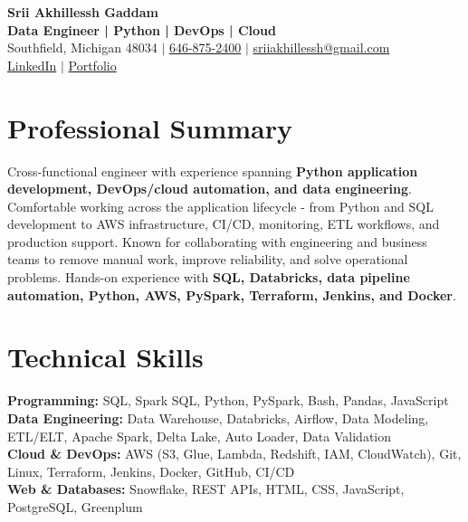 \documentclass[letterpaper,10pt]{article}
\begin{document}
\fontsize{9.35pt}{10.45pt}\selectfont

\begin{center}
    {\LARGE \textbf{Srii Akhillessh Gaddam}} \\[-1pt]
    \textbf{Data Engineer | Python | DevOps | Cloud} \\[2pt]
    Southfield, Michigan 48034 $|$
    \href{tel:6468752400}{646-875-2400} $|$
    \href{mailto:sriiakhillessh@gmail.com}{sriiakhillessh@gmail.com} \\[1pt]
    \href{https://www.linkedin.com/in/srii-akhiilessh-gaddam-b48668191/}{LinkedIn} $|$
    \href{https://sriiakhillesshg.github.io/portfolio/}{Portfolio}
\end{center}
\vspace{-8pt}

\section{Professional Summary}
\small{Cross-functional engineer with experience spanning \textbf{Python application development, DevOps/cloud automation, and data engineering}. Comfortable working across the application lifecycle - from Python and SQL development to AWS infrastructure, CI/CD, monitoring, ETL workflows, and production support. Known for collaborating with engineering and business teams to remove manual work, improve reliability, and solve operational problems. Hands-on experience with \textbf{SQL, Databricks, data pipeline automation, Python, AWS, PySpark, Terraform, Jenkins, and Docker}.}

\section{Technical Skills}
\small{
\textbf{Programming:} SQL, Spark SQL, Python, PySpark, Bash, Pandas, JavaScript \\
\textbf{Data Engineering:} Data Warehouse, Databricks, Airflow, Data Modeling, ETL/ELT, Apache Spark, Delta Lake, Auto Loader, Data Validation \\
\textbf{Cloud \& DevOps:} AWS (S3, Glue, Lambda, Redshift, IAM, CloudWatch), Git, Linux, Terraform, Jenkins, Docker, GitHub, CI/CD \\
\textbf{Web \& Databases:} Snowflake, REST APIs, HTML, CSS, JavaScript, PostgreSQL, Greenplum
}
\end{document}
